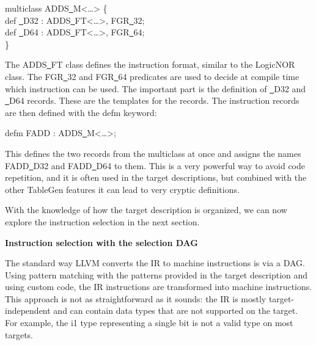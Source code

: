 \begin{tcolorbox}[colback=white,colframe=black]
multiclass ADDS\underline{~}M<…> \{ \\
\hspace*{1cm}def \underline{~}D32 : ADDS\underline{~}FT<…>, FGR\underline{~}32; \\
\hspace*{1cm}def \underline{~}D64 : ADDS\underline{~}FT<…>, FGR\underline{~}64; \\
\}
\end{tcolorbox}

The ADDS\underline{~}FT class defines the instruction format, similar to the LogicNOR class. The FGR\underline{~}32 and FGR\underline{~}64 predicates are used to decide at compile time which instruction can be used. The important part is the definition of \underline{~}D32 and \underline{~}D64 records. These are the templates for the records. The instruction records are then defined with the defm keyword:\par

\begin{tcolorbox}[colback=white,colframe=black]
defm FADD : ADDS\underline{~}M<…>;
\end{tcolorbox}

This defines the two records from the multiclass at once and assigns the names FADD\underline{~}D32 and FADD\underline{~}D64 to them. This is a very powerful way to avoid code repetition, and it is often used in the target descriptions, but combined with the other TableGen features it can lead to very cryptic definitions.\par

With the knowledge of how the target description is organized, we can now explore the instruction selection in the next section.\par

\hspace*{\fill} \par %
\textbf{Instruction selection with the selection DAG}

The standard way LLVM converts the IR to machine instructions is via a DAG. Using pattern matching with the patterns provided in the target description and using custom code, the IR instructions are transformed into machine instructions. This approach is not as straightforward as it sounds: the IR is mostly target-independent and can contain data types that are not supported on the target. For example, the i1 type representing a single bit is not a valid type on most targets.\par

